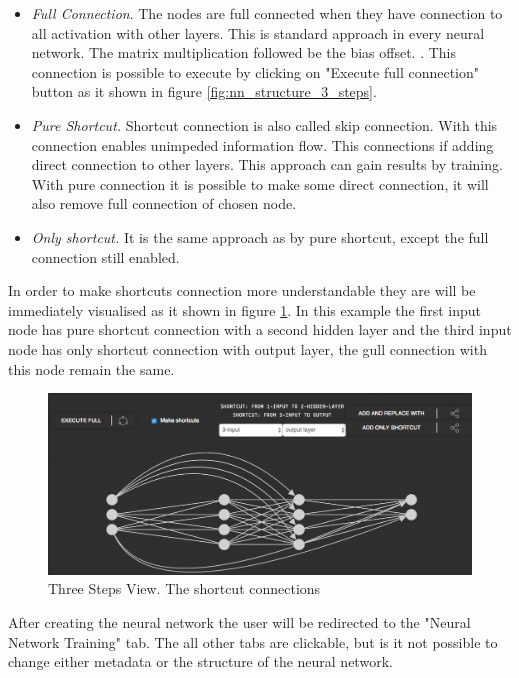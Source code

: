 \begin{itemize}
\item \emph{Full Connection}. The nodes are full connected when they have connection to all activation with other layers. This is standard approach in every neural network. The matrix multiplication followed be the bias offset. \cite{nn_connection}. This connection is possible to execute by clicking on "Execute full connection" button as it shown in figure \ref{fig:nn_structure_3_steps}.
\item \emph{Pure Shortcut.} Shortcut connection is also called skip connection. With this connection enables unimpeded information flow. This connections if adding direct connection to other layers. This approach can gain results by training. \cite{shortcuts_nn} With pure connection it is possible to make some direct connection, it will also remove full connection of chosen node.
\item \emph{Only shortcut.} It is the same approach as by pure shortcut, except the full connection still enabled. 
\end{itemize}

In order to make shortcuts connection more understandable they are will be immediately visualised as it shown in figure \ref{fig:connection_3_steps}. In this example the first input node has pure shortcut connection with a second hidden layer and the third input node has only shortcut connection with output layer, the gull connection with this node remain the same.

\begin{figure}[htbp]
\begin{center}
  \includegraphics[width=\linewidth]{components/5/img/connection_3_steps.png}
  \caption{Three Steps View. The shortcut connections}
  \label{fig:connection_3_steps}
\end{center}
\end{figure}

After creating the neural network the user will be redirected to the "Neural Network Training" tab. The all other tabs are clickable, but is it not possible to change either metadata or the structure of the neural network.

